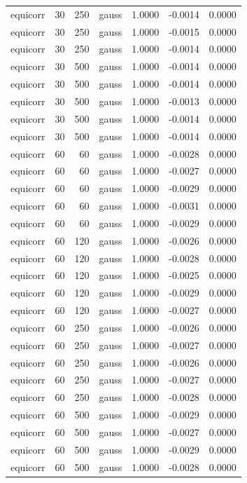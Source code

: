 \begin{tabular}{lrrlrrr}
equicorr & 30 & 250 & gauss & 1.0000 & -0.0014 & 0.0000 \\
equicorr & 30 & 250 & gauss & 1.0000 & -0.0015 & 0.0000 \\
equicorr & 30 & 250 & gauss & 1.0000 & -0.0014 & 0.0000 \\
equicorr & 30 & 500 & gauss & 1.0000 & -0.0014 & 0.0000 \\
equicorr & 30 & 500 & gauss & 1.0000 & -0.0014 & 0.0000 \\
equicorr & 30 & 500 & gauss & 1.0000 & -0.0013 & 0.0000 \\
equicorr & 30 & 500 & gauss & 1.0000 & -0.0014 & 0.0000 \\
equicorr & 30 & 500 & gauss & 1.0000 & -0.0014 & 0.0000 \\
equicorr & 60 & 60 & gauss & 1.0000 & -0.0028 & 0.0000 \\
equicorr & 60 & 60 & gauss & 1.0000 & -0.0027 & 0.0000 \\
equicorr & 60 & 60 & gauss & 1.0000 & -0.0029 & 0.0000 \\
equicorr & 60 & 60 & gauss & 1.0000 & -0.0031 & 0.0000 \\
equicorr & 60 & 60 & gauss & 1.0000 & -0.0029 & 0.0000 \\
equicorr & 60 & 120 & gauss & 1.0000 & -0.0026 & 0.0000 \\
equicorr & 60 & 120 & gauss & 1.0000 & -0.0028 & 0.0000 \\
equicorr & 60 & 120 & gauss & 1.0000 & -0.0025 & 0.0000 \\
equicorr & 60 & 120 & gauss & 1.0000 & -0.0029 & 0.0000 \\
equicorr & 60 & 120 & gauss & 1.0000 & -0.0027 & 0.0000 \\
equicorr & 60 & 250 & gauss & 1.0000 & -0.0026 & 0.0000 \\
equicorr & 60 & 250 & gauss & 1.0000 & -0.0027 & 0.0000 \\
equicorr & 60 & 250 & gauss & 1.0000 & -0.0026 & 0.0000 \\
equicorr & 60 & 250 & gauss & 1.0000 & -0.0027 & 0.0000 \\
equicorr & 60 & 250 & gauss & 1.0000 & -0.0028 & 0.0000 \\
equicorr & 60 & 500 & gauss & 1.0000 & -0.0029 & 0.0000 \\
equicorr & 60 & 500 & gauss & 1.0000 & -0.0027 & 0.0000 \\
equicorr & 60 & 500 & gauss & 1.0000 & -0.0029 & 0.0000 \\
equicorr & 60 & 500 & gauss & 1.0000 & -0.0028 & 0.0000 \\

\end{tabular}
